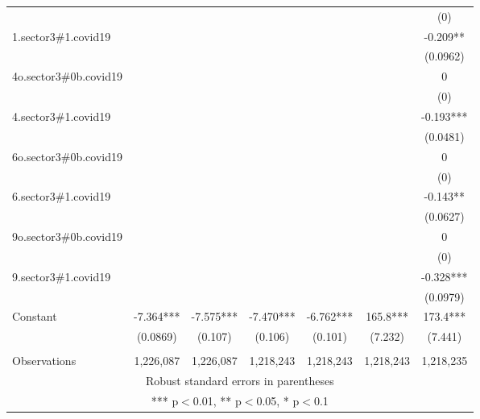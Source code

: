\documentclass[]{article}
\begin{document}
\begin{tabular}{lcccccc}
 &  &  &  &  &  & (0) \\
1.sector3\#1.covid19 &  &  &  &  &  & -0.209** \\
 &  &  &  &  &  & (0.0962) \\
4o.sector3\#0b.covid19 &  &  &  &  &  & 0 \\
 &  &  &  &  &  & (0) \\
4.sector3\#1.covid19 &  &  &  &  &  & -0.193*** \\
 &  &  &  &  &  & (0.0481) \\
6o.sector3\#0b.covid19 &  &  &  &  &  & 0 \\
 &  &  &  &  &  & (0) \\
6.sector3\#1.covid19 &  &  &  &  &  & -0.143** \\
 &  &  &  &  &  & (0.0627) \\
9o.sector3\#0b.covid19 &  &  &  &  &  & 0 \\
 &  &  &  &  &  & (0) \\
9.sector3\#1.covid19 &  &  &  &  &  & -0.328*** \\
 &  &  &  &  &  & (0.0979) \\
Constant & -7.364*** & -7.575*** & -7.470*** & -6.762*** & 165.8*** & 173.4*** \\
 & (0.0869) & (0.107) & (0.106) & (0.101) & (7.232) & (7.441) \\
 &  &  &  &  &  &  \\
 Observations & 1,226,087 & 1,226,087 & 1,218,243 & 1,218,243 & 1,218,243 & 1,218,235 \\ \hline
\multicolumn{7}{c}{ Robust standard errors in parentheses} \\
\multicolumn{7}{c}{ *** p$<$0.01, ** p$<$0.05, * p$<$0.1} \\
\end{tabular}
\end{document}

